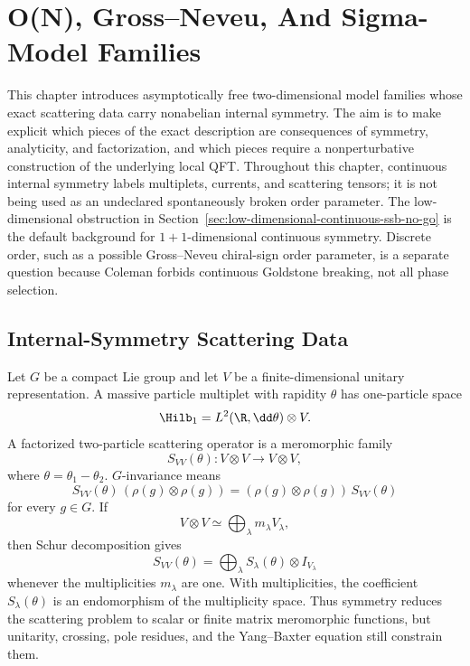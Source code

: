 \chapter{O(N), Gross--Neveu, And Sigma-Model Families}
\label{ch:integrable-on-gross-neveu-sigma-model-families}

\ConventionsMixedCFT

This chapter introduces asymptotically free two-dimensional model families
whose exact scattering data carry nonabelian internal symmetry.  The aim is to
make explicit which pieces of the exact description are consequences of
symmetry, analyticity, and factorization, and which pieces require a
nonperturbative construction of the underlying local QFT.
Throughout this chapter, continuous internal symmetry labels multiplets,
currents, and scattering tensors; it is not being used as an undeclared
spontaneously broken order parameter.  The low-dimensional obstruction in
Section~\ref{sec:low-dimensional-continuous-ssb-no-go} is the default
background for \(1+1\)-dimensional continuous symmetry.  Discrete order, such
as a possible Gross--Neveu chiral-sign order parameter, is a separate question
because Coleman forbids continuous Goldstone breaking, not all phase
selection.

\section{Internal-Symmetry Scattering Data}
\label{sec:integrable-scattering-data}

Let \(G\) be a compact Lie group and let \(V\) be a finite-dimensional
unitary representation.  A massive particle multiplet with rapidity
\(\theta\) has one-particle space
\[
  \Hilb_1=L^2(\R,\dd\theta)\otimes V .
\]
A factorized two-particle scattering operator is a meromorphic family
\[
  S_{VV}(\theta):V\otimes V\longrightarrow V\otimes V,
\]
where \(\theta=\theta_1-\theta_2\).  \(G\)-invariance means
\[
  S_{VV}(\theta)\,(\rho(g)\otimes\rho(g))
  =
  (\rho(g)\otimes\rho(g))\,S_{VV}(\theta)
\]
for every \(g\in G\).  If
\[
  V\otimes V\simeq \bigoplus_\lambda m_\lambda V_\lambda ,
\]
then Schur decomposition gives
\[
  S_{VV}(\theta)
  =
  \bigoplus_\lambda S_\lambda(\theta)\otimes I_{V_\lambda}
\]
whenever the multiplicities \(m_\lambda\) are one.  With multiplicities, the
coefficient \(S_\lambda(\theta)\) is an endomorphism of the multiplicity
space.  Thus symmetry reduces the scattering problem to scalar or finite
matrix meromorphic functions, but unitarity, crossing, pole residues, and the
Yang--Baxter equation still constrain them.

